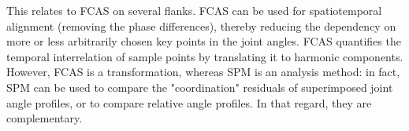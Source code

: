 \begin{change}
This relates to FCAS on several flanks.
FCAS can be used for spatiotemporal alignment (removing the phase differences), thereby reducing the dependency on more or less arbitrarily chosen key points in the joint angles.
FCAS quantifies the temporal interrelation of sample points by translating it to harmonic components.
However, FCAS is a transformation, whereas SPM is an analysis method: in fact, SPM can be used to compare the "coordination" residuals of superimposed joint angle profiles, or to compare relative angle profiles.
In that regard, they are complementary.
\end{change}
